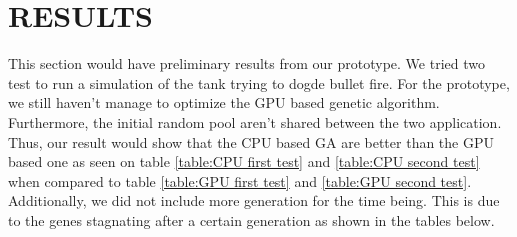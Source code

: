 \chapter{RESULTS}
This section would have preliminary results from our prototype. We tried two test to run a simulation of the tank
trying to dogde bullet fire. For the prototype, we still haven't manage to optimize the GPU based genetic algorithm.
Furthermore, the initial random pool aren't shared between the two application.  Thus, our result would show that
the CPU based GA are better than the GPU based one as seen on table \ref{table:CPU first test} and 
\ref{table:CPU second test} when compared to table \ref{table:GPU first test} and \ref{table:GPU second test}. 
Additionally, we did not include more generation for the time being. This is due to the genes stagnating after a 
certain generation as shown in the tables below.


